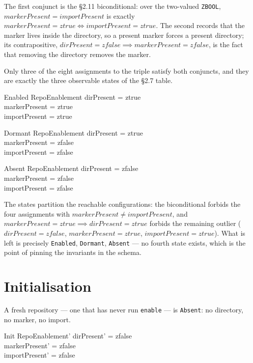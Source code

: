 \documentclass[a4paper,10pt,fleqn]{article}
\begin{document}
The first conjunct is the \S2.11 biconditional: over the two-valued
\texttt{ZBOOL}, $markerPresent = importPresent$ is exactly
$markerPresent = ztrue \iff importPresent = ztrue$. The second records that the
marker lives inside the directory, so a present marker forces a present
directory; its contrapositive, $dirPresent = zfalse \implies markerPresent =
zfalse$, is the fact that removing the directory removes the marker.

Only three of the eight assignments to the triple satisfy both conjuncts, and
they are exactly the three observable states of the \S2.7 table.

\begin{schema}{Enabled}
  RepoEnablement
  \where
  dirPresent = ztrue \\
  markerPresent = ztrue \\
  importPresent = ztrue
\end{schema}

\begin{schema}{Dormant}
  RepoEnablement
  \where
  dirPresent = ztrue \\
  markerPresent = zfalse \\
  importPresent = zfalse
\end{schema}

\begin{schema}{Absent}
  RepoEnablement
  \where
  dirPresent = zfalse \\
  markerPresent = zfalse \\
  importPresent = zfalse
\end{schema}

The states partition the reachable configurations: the biconditional forbids the
four assignments with $markerPresent \neq importPresent$, and $markerPresent =
ztrue \implies dirPresent = ztrue$ forbids the remaining outlier
($dirPresent = zfalse$, $markerPresent = ztrue$, $importPresent = ztrue$). What
is left is precisely \texttt{Enabled}, \texttt{Dormant}, \texttt{Absent} --- no
fourth state exists, which is the point of pinning the invariants in the schema.

\section{Initialisation}

A fresh repository --- one that has never run \texttt{enable} --- is
\texttt{Absent}: no directory, no marker, no import.

\begin{schema}{Init}
  RepoEnablement'
  \where
  dirPresent' = zfalse \\
  markerPresent' = zfalse \\
  importPresent' = zfalse
\end{schema}
\end{document}
